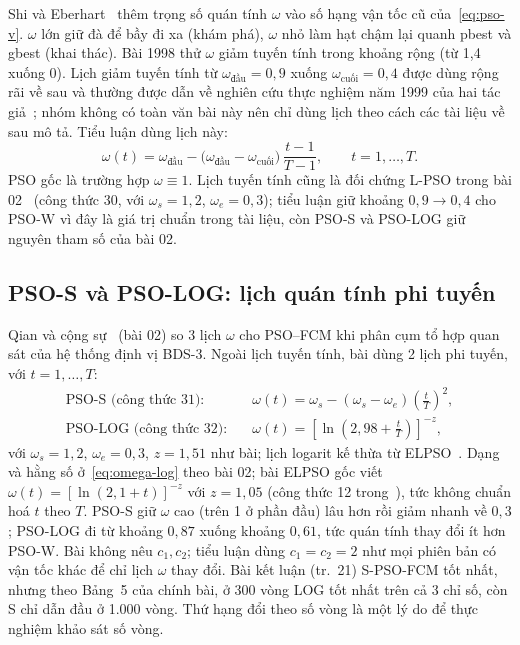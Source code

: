 Shi và Eberhart~\cite{shi1998inertia} thêm trọng số quán tính $\omega$ vào số hạng vận tốc cũ của~\eqref{eq:pso-v}. $\omega$
lớn giữ đà để bầy đi xa (khám phá), $\omega$ nhỏ làm hạt chậm lại quanh pbest và gbest (khai thác). Bài 1998 thử $\omega$
giảm tuyến tính trong khoảng rộng (từ 1,4 xuống 0). Lịch giảm tuyến tính từ $\omega_{\text{đầu}} = 0{,}9$ xuống
$\omega_{\text{cuối}} = 0{,}4$ được dùng rộng rãi về sau và thường được dẫn về nghiên cứu thực nghiệm năm 1999 của hai tác
giả~\cite{shi1999empirical}; nhóm không có toàn văn bài này nên chỉ dùng lịch theo cách các tài liệu về sau mô tả. Tiểu luận dùng lịch này:
\begin{equation}
  \omega(t) = \omega_{\text{đầu}} - \big(\omega_{\text{đầu}} - \omega_{\text{cuối}}\big)\,\frac{t - 1}{T - 1},
  \qquad t = 1, \dots, T.
  \label{eq:pso-omega}
\end{equation}
PSO gốc là trường hợp $\omega \equiv 1$. Lịch tuyến tính cũng là đối chứng L-PSO trong bài 02~\cite{qian2022psofcm} (công thức 30, với
$\omega_s = 1{,}2$, $\omega_e = 0{,}3$); tiểu luận giữ khoảng $0{,}9 \to 0{,}4$ cho PSO-W vì đây là giá trị chuẩn trong tài liệu,
còn PSO-S và PSO-LOG giữ nguyên tham số của bài 02.

\subsection{PSO-S và PSO-LOG: lịch quán tính phi tuyến}
\label{sec:pso-s-log}

Qian và cộng sự~\cite{qian2022psofcm} (bài 02) so 3 lịch $\omega$ cho PSO--FCM khi phân cụm tổ hợp quan sát của hệ thống
định vị BDS-3. Ngoài lịch tuyến tính, bài dùng 2 lịch phi tuyến, với $t = 1, \dots, T$:
\begin{align}
  \text{PSO-S (công thức 31):}\quad & \omega(t) = \omega_s - (\omega_s - \omega_e)\left(\frac{t}{T}\right)^{2}, \label{eq:omega-s}\\
  \text{PSO-LOG (công thức 32):}\quad & \omega(t) = \left[\ln\!\left(2{,}98 + \frac{t}{T}\right)\right]^{-z}, \label{eq:omega-log}
\end{align}
với $\omega_s = 1{,}2$, $\omega_e = 0{,}3$, $z = 1{,}51$ như bài; lịch logarit kế thừa từ ELPSO~\cite{zhang2020elpso}.
Dạng và hằng số ở~\eqref{eq:omega-log} theo bài 02; bài ELPSO gốc viết $\omega(t) = [\ln(2{,}1 + t)]^{-z}$ với $z = 1{,}05$
(công thức 12 trong~\cite{zhang2020elpso}), tức không chuẩn hoá $t$ theo $T$.
PSO-S giữ $\omega$ cao (trên 1 ở phần đầu) lâu hơn rồi giảm nhanh về $0{,}3$; PSO-LOG đi từ khoảng $0{,}87$ xuống khoảng
$0{,}61$, tức quán tính thay đổi ít hơn PSO-W. Bài không nêu $c_1, c_2$; tiểu luận dùng $c_1 = c_2 = 2$ như mọi phiên bản
có vận tốc khác để chỉ lịch $\omega$ thay đổi. Bài kết luận (tr.~21) S-PSO-FCM tốt nhất, nhưng theo Bảng~5 của chính bài,
ở 300 vòng LOG tốt nhất trên cả 3 chỉ số, còn S chỉ dẫn đầu ở 1.000 vòng. Thứ hạng đổi theo số vòng là một lý do để thực
nghiệm khảo sát số vòng.

